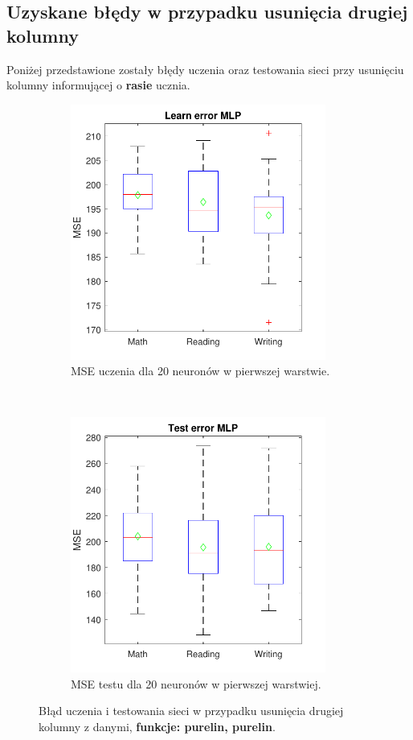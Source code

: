 \documentclass[12pt]{article}
\begin{document}
\pagebreak
\subsection{Uzyskane błędy w przypadku usunięcia drugiej  kolumny}
Poniżej przedstawione zostały błędy uczenia oraz testowania sieci przy usunięciu kolumny informującej o \textbf{rasie} ucznia.

\begin{figure}[H]
\centering
\begin{subfigure}[t]{0.48\textwidth} 
\centering
\includegraphics[height=3.3in]{purelin_purelin_20_without_2_learnBoxplot.pdf}
\caption{MSE uczenia dla  20 neuronów w pierwszej warstwie.}
\end{subfigure}
~~
\begin{subfigure}[t]{0.48\textwidth} 
\centering
\includegraphics[height=3.3in]{purelin_purelin_20_without_2_testBoxplot.pdf}
\caption{MSE testu dla  20  neuronów w pierwszej warstwiej.}
\end{subfigure}

\caption{Błąd uczenia i testowania sieci w przypadku usunięcia drugiej kolumny z danymi, \textbf{funkcje: purelin, purelin}.}
\end{figure}
\end{document}
